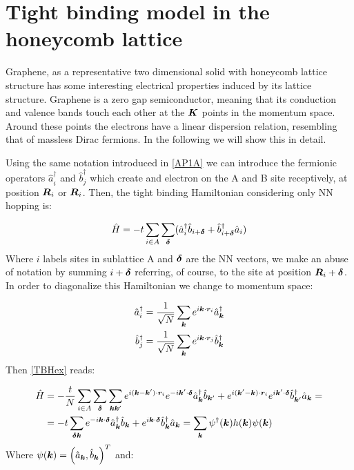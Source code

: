 \chapter{Tight binding model in the honeycomb lattice}
\label{APD}

Graphene, as a representative two dimensional solid with honeycomb lattice structure has some interesting electrical properties induced by its lattice structure. Graphene is a zero gap semiconductor, meaning that its conduction and valence bands touch each other at the $\boldsymbol{K}$ points in the momentum space. Around these points the electrons have a linear dispersion relation, resembling that of massless Dirac fermions. In the following we will show this in detail.

Using the same notation introduced in \ref{AP1A} we can introduce the fermionic operators $\hat{a}^\dagger_i$ and $\hat{b}^\dagger_j$ which create and electron on the A and B site receptively, at position $\boldsymbol{R}_i$ or $\boldsymbol{R}_i$. Then, the tight binding Hamiltonian considering only NN hopping is:

\begin{equation}
\label{TBHex}
\hat{H} = -t\sum_{i \in A}\sum_{\boldsymbol{\delta}} (\hat{a}^\dagger_i\hat{b}_{i+\boldsymbol{\delta}} + \hat{b}^\dagger_{i+\boldsymbol{\delta}}\hat{a}_i)
\end{equation}
Where $i$ labels sites in sublattice A and $\boldsymbol{\delta}$ are the NN vectors, we make an abuse of notation by summing $i+\boldsymbol{\delta}$ referring, of course, to the site at position $\boldsymbol{R}_i+\boldsymbol{\delta}$. In order to diagonalize this Hamiltonian we change to momentum space:

\begin{align}
\hat{a}^\dagger_i &= \frac{1}{\sqrt{N}} \sum_{\boldsymbol{k}} e^{i\boldsymbol{k}\cdot\boldsymbol{r}_i}\hat{a}^\dagger_{\boldsymbol{k}} \\
\hat{b}^\dagger_j &= \frac{1}{\sqrt{N}} \sum_{\boldsymbol{k}} e^{i\boldsymbol{k}\cdot\boldsymbol{r}_j}\hat{b}^\dagger_{\boldsymbol{k}} 
\end{align}
Then \ref{TBHex} reads:

\begin{align*}
\hat{H} &= -\frac{t}{N} \sum_{i \in A}\sum_{\boldsymbol{\delta}} \sum_{\boldsymbol{k}\boldsymbol{k}'} e^{i(\boldsymbol{k}-\boldsymbol{k}')\cdot\boldsymbol{r}_i}e^{-i\boldsymbol{k}'\cdot\boldsymbol{\delta}} \hat{a}^\dagger_{\boldsymbol{k}}\hat{b}_{\boldsymbol{k}'} + e^{i(\boldsymbol{k}'-\boldsymbol{k})\cdot\boldsymbol{r}_i}e^{i\boldsymbol{k}'\cdot\boldsymbol{\delta}} \hat{b}^\dagger_{\boldsymbol{k}'}\hat{a}_{\boldsymbol{k}} = \\
&= -t \sum_{\boldsymbol{\delta}\boldsymbol{k}} e^{-i\boldsymbol{k}\cdot\boldsymbol{\delta}} \hat{a}^\dagger_{\boldsymbol{k}}\hat{b}_{\boldsymbol{k}} +e^{i\boldsymbol{k}\cdot\boldsymbol{\delta}} \hat{b}^\dagger_{\boldsymbol{k}}\hat{a}_{\boldsymbol{k}} = \sum_{\boldsymbol{k}} \psi^\dagger(\boldsymbol{k})h(\boldsymbol{k})\psi(\boldsymbol{k})
\end{align*}
Where $\psi(\boldsymbol{k}) = \left( \hat{a}_{\boldsymbol{k}}, \hat{b}_{\boldsymbol{k}} \right)^T$ and:

